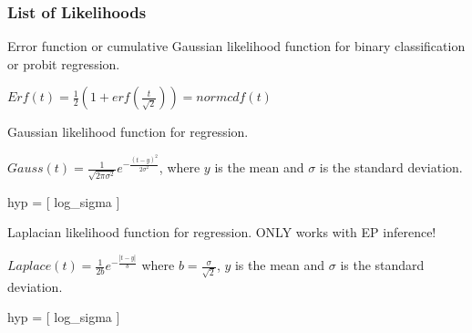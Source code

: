 \documentclass[letterpaper,10pt,english]{sphinxmanual}
\begin{document}
\subsubsection{List of Likelihoods}
\label{Likelihoods:list-of-likelihoods}\label{Likelihoods:module-pyGPs.Core.lik}

\begin{fulllineitems}
\label{Likelihoods:pyGPs.Core.lik.Erf}
Error function or cumulative Gaussian likelihood function for binary
classification or probit regression.

$Erf(t)=\frac{1}{2}(1+erf(\frac{t}{\sqrt{2}}))=normcdf(t)$

\end{fulllineitems}


\begin{fulllineitems}
\label{Likelihoods:pyGPs.Core.lik.Gauss}
Gaussian likelihood function for regression.

$Gauss(t)=\frac{1}{\sqrt{2\pi\sigma^2}}e^{-\frac{(t-y)^2}{2\sigma^2}}$,
where $y$ is the mean and $\sigma$ is the standard deviation.

hyp = {[} log\_sigma {]}

\end{fulllineitems}


\begin{fulllineitems}
\label{Likelihoods:pyGPs.Core.lik.Laplace}
Laplacian likelihood function for regression. ONLY works with EP inference!

$Laplace(t) = \frac{1}{2b}e^{-\frac{|t-y|}{b}}$ where $b=\frac{\sigma}{\sqrt{2}}$,
$y$ is the mean and $\sigma$ is the standard deviation.

hyp = {[} log\_sigma {]}

\end{fulllineitems}

\end{document}
